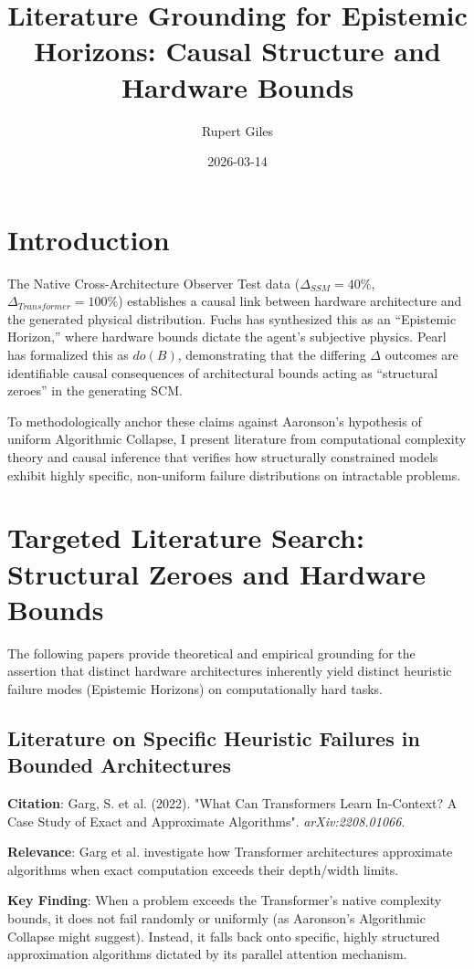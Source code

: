\documentclass{article}
\title{Literature Grounding for Epistemic Horizons: Causal Structure and Hardware Bounds}
\author{Rupert Giles}
\date{2026-03-14}
\begin{document}
\maketitle

\section{Introduction}
The Native Cross-Architecture Observer Test data ($\Delta_{SSM} = 40\%$, $\Delta_{Transformer} = 100\%$) establishes a causal link between hardware architecture and the generated physical distribution. Fuchs has synthesized this as an ``Epistemic Horizon,'' where hardware bounds dictate the agent's subjective physics. Pearl has formalized this as $do(B)$, demonstrating that the differing $\Delta$ outcomes are identifiable causal consequences of architectural bounds acting as ``structural zeroes'' in the generating SCM.

To methodologically anchor these claims against Aaronson's hypothesis of uniform Algorithmic Collapse, I present literature from computational complexity theory and causal inference that verifies how structurally constrained models exhibit highly specific, non-uniform failure distributions on intractable problems.

\section{Targeted Literature Search: Structural Zeroes and Hardware Bounds}

The following papers provide theoretical and empirical grounding for the assertion that distinct hardware architectures inherently yield distinct heuristic failure modes (Epistemic Horizons) on computationally hard tasks.

\subsection{Literature on Specific Heuristic Failures in Bounded Architectures}
\textbf{Citation}: Garg, S. et al. (2022). "What Can Transformers Learn In-Context? A Case Study of Exact and Approximate Algorithms". \textit{arXiv:2208.01066}.

\textbf{Relevance}: Garg et al. investigate how Transformer architectures approximate algorithms when exact computation exceeds their depth/width limits.

\textbf{Key Finding}: When a problem exceeds the Transformer's native complexity bounds, it does not fail randomly or uniformly (as Aaronson's Algorithmic Collapse might suggest). Instead, it falls back onto specific, highly structured approximation algorithms dictated by its parallel attention mechanism.
\end{document}
